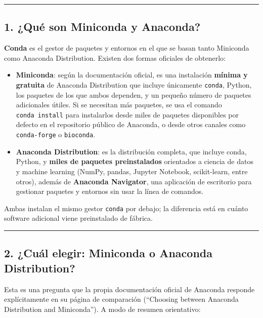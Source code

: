\documentclass[
  doc,
  floatsintext,
  longtable,
  a4paper,
  nolmodern,
  notxfonts,
  notimes,
  12pt,
  colorlinks=true,linkcolor=blue,citecolor=blue,urlcolor=blue]{apa7}
\begin{document}
\begin{center}\rule{0.5\linewidth}{0.5pt}\end{center}

\subsection{1. ¿Qué son Miniconda y
Anaconda?}\label{quuxe9-son-miniconda-y-anaconda}

\textbf{Conda} es el gestor de paquetes y entornos en el que se basan
tanto Miniconda como Anaconda Distribution. Existen dos formas oficiales
de obtenerlo:

\begin{itemize}
\item
  \textbf{Miniconda}: según la documentación oficial, es una instalación
  \textbf{mínima y gratuita} de Anaconda Distribution que incluye
  únicamente \texttt{conda}, Python, los paquetes de los que ambos
  dependen, y un pequeño número de paquetes adicionales útiles. Si se
  necesitan más paquetes, se usa el comando \texttt{conda\ install} para
  instalarlos desde miles de paquetes disponibles por defecto en el
  repositorio público de Anaconda, o desde otros canales como
  \texttt{conda-forge} o \texttt{bioconda}.
\item
  \textbf{Anaconda Distribution}: es la distribución completa, que
  incluye conda, Python, y \textbf{miles de paquetes preinstalados}
  orientados a ciencia de datos y machine learning (NumPy, pandas,
  Jupyter Notebook, scikit-learn, entre otros), además de
  \textbf{Anaconda Navigator}, una aplicación de escritorio para
  gestionar paquetes y entornos sin usar la línea de comandos.
\end{itemize}

Ambas instalan el mismo gestor \texttt{conda} por debajo; la diferencia
está en cuánto software adicional viene preinstalado de fábrica.

\begin{center}\rule{0.5\linewidth}{0.5pt}\end{center}

\subsection{2. ¿Cuál elegir: Miniconda o Anaconda
Distribution?}\label{cuuxe1l-elegir-miniconda-o-anaconda-distribution}

Esta es una pregunta que la propia documentación oficial de Anaconda
responde explícitamente en su página de comparación (``Choosing between
Anaconda Distribution and Miniconda''). A modo de resumen orientativo:
\end{document}
